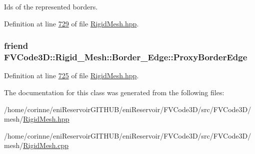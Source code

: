 Ids of the represented borders. 



Definition at line \hyperlink{RigidMesh_8hpp_source_l00729}{729} of file \hyperlink{RigidMesh_8hpp_source}{Rigid\+Mesh.\+hpp}.

\subsubsection[{\texorpdfstring{Proxy\+Border\+Edge}{ProxyBorderEdge}}]{\setlength{\rightskip}{0pt plus 5cm}friend F\+V\+Code3\+D\+::\+Rigid\+\_\+\+Mesh\+::\+Border\+\_\+\+Edge\+::\+Proxy\+Border\+Edge}\hypertarget{classFVCode3D_1_1Rigid__Mesh_1_1Border__Edge_a189ee28caab235105a5112a5d8fc9953}{}\label{classFVCode3D_1_1Rigid__Mesh_1_1Border__Edge_a189ee28caab235105a5112a5d8fc9953}


Definition at line \hyperlink{RigidMesh_8hpp_source_l00725}{725} of file \hyperlink{RigidMesh_8hpp_source}{Rigid\+Mesh.\+hpp}.



The documentation for this class was generated from the following files\+:\begin{DoxyCompactItemize}
\item 
/home/corinne/eni\+Reservoir\+G\+I\+T\+H\+U\+B/eni\+Reservoir/\+F\+V\+Code3\+D/src/\+F\+V\+Code3\+D/mesh/\hyperlink{RigidMesh_8hpp}{Rigid\+Mesh.\+hpp}\item 
/home/corinne/eni\+Reservoir\+G\+I\+T\+H\+U\+B/eni\+Reservoir/\+F\+V\+Code3\+D/src/\+F\+V\+Code3\+D/mesh/\hyperlink{RigidMesh_8cpp}{Rigid\+Mesh.\+cpp}\end{DoxyCompactItemize}
